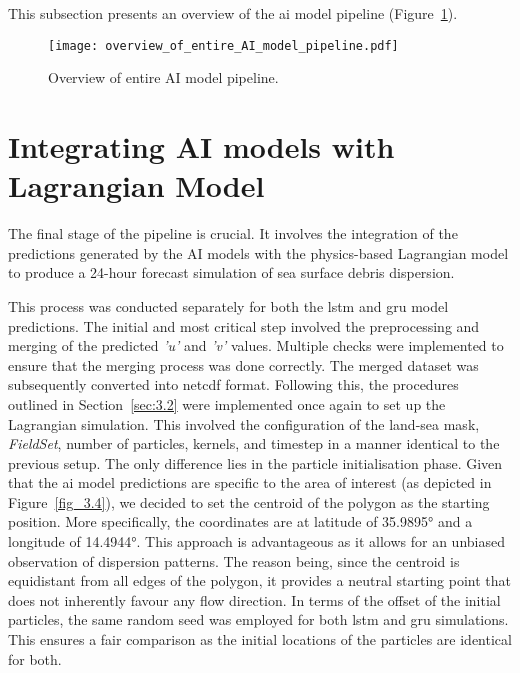 This subsection presents an overview of the \acrshort{ai} model pipeline (Figure~\ref{fig_3.8}). 

\begin{figure}[htbp]
    \centering
    \texttt{[image: overview\_of\_entire\_AI\_model\_pipeline.pdf]}
    \caption[Short sample caption.]{Overview of entire AI model pipeline.\label{fig_3.8}}
\end{figure}

\section{Integrating AI models with Lagrangian Model}
\label{sec:3.4}

The final stage of the pipeline is crucial. It involves the integration of the predictions generated by the AI models with the physics-based Lagrangian model to produce a 24-hour forecast simulation of sea surface debris dispersion.

This process was conducted separately for both the \acrshort{lstm} and \acrshort{gru} model predictions. The initial and most critical step involved the preprocessing and merging of the predicted \textit{'u'} and \textit{'v'} values. Multiple checks were implemented to ensure that the merging process was done correctly. The merged dataset was subsequently converted into \acrshort{netcdf} format. Following this, the procedures outlined in Section~\ref{sec:3.2} were implemented once again to set up the Lagrangian simulation. This involved the configuration of the land-sea mask, \textit{FieldSet}, number of particles, kernels, and timestep in a manner identical to the previous setup. The only difference lies in the particle initialisation phase. Given that the \acrshort{ai} model predictions are specific to the area of interest (as depicted in Figure~\ref{fig_3.4}), we decided to set the centroid of the polygon as the starting position. More specifically, the coordinates are at latitude of 35.9895° and a longitude of 14.4944°. This approach is advantageous as it allows for an unbiased observation of dispersion patterns. The reason being, since the centroid is equidistant from all edges of the polygon, it provides a neutral starting point that does not inherently favour any flow direction. In terms of the offset of the initial particles, the same random seed was employed for both \acrshort{lstm} and \acrshort{gru} simulations. This ensures a fair comparison as the initial locations of the particles are identical for both.

